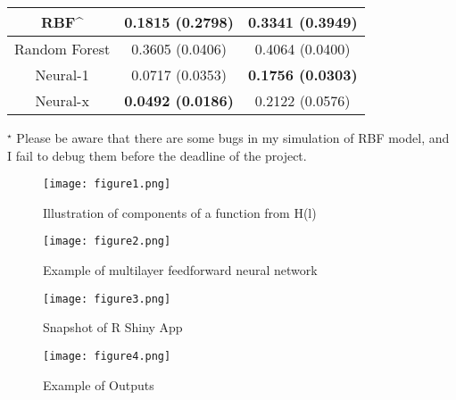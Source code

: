 \documentclass[a4paper, 12pt]{article}
\begin{document}
\begin{table}
{\begin{tabular}{c||c|c}
	\hline
	RBF^\star & 0.1815 (0.2798) & 0.3341 (0.3949) \\
	\hline
	Random Forest & 0.3605 (0.0406) & 0.4064 (0.0400) \\
	\hline
	Neural-1 & 0.0717 (0.0353) & \textbf{0.1756 (0.0303)} \\
	\hline
	Neural-x & \textbf{0.0492 (0.0186)} & 0.2122 (0.0576) \\
	\hline
\end{tabular}
 }
 \begin{tablenotes}
      \normalsize
      \item  ${}^\star$ Please be aware that there are some bugs in my simulation of RBF model, and I fail to debug them before the deadline of the project.
    \end{tablenotes}

\end{table}

\clearpage
\newpage

\begin{figure}[hp]
  \centering
  \texttt{[image: figure1.png]}
  \caption{Illustration of components of a function from H(l)}
  \label{fig1}
\end{figure}

\clearpage
\newpage

\begin{figure}[hp]
  \centering
  \texttt{[image: figure2.png]}
  \caption{Example of multilayer feedforward neural network}
  \label{fig2}
\end{figure}

\clearpage
\newpage

\begin{figure}[hp]
  \texttt{[image: figure3.png]}
  \caption{Snapshot of R Shiny App}
  \label{fig3}
\end{figure}

\clearpage
\newpage

\begin{figure}[hp]
  \texttt{[image: figure4.png]}
  \caption{Example of Outputs}
  \label{fig4}
\end{figure}

\clearpage



\printbibliography
\end{document}
